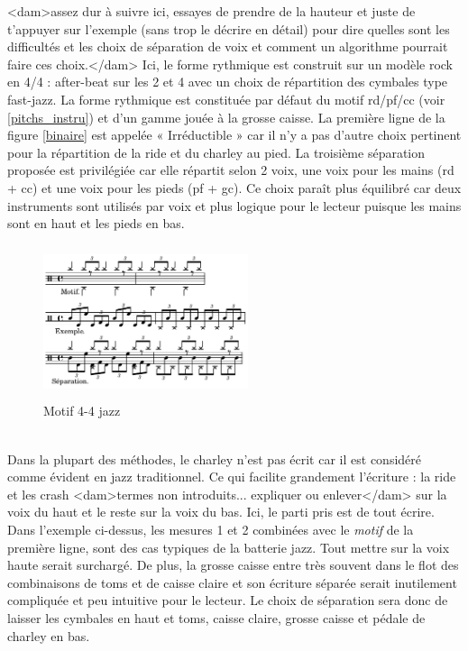 <dam>assez dur à suivre ici, essayes de prendre de la hauteur et juste de t'appuyer sur l'exemple (sans trop le décrire en détail) pour dire quelles sont les difficultés et les choix de séparation de voix et comment un algorithme pourrait faire ces choix.</dam>
Ici, le forme rythmique est construit sur un modèle rock en 4/4 : after-beat
sur les 2 et 4 avec un choix de répartition des cymbales type fast-jazz. La
forme rythmique est constituée par défaut du motif rd/pf/cc (voir
\ref{pitchs_instru}) et d’un gamme jouée à la grosse caisse. La première ligne
de la figure \ref{binaire} est appelée « Irréductible » car il n’y a pas
d’autre choix pertinent pour la répartition de la ride et du charley au pied.
La troisième séparation proposée est privilégiée car elle répartit selon 2
voix, une voix pour les mains (rd + cc) et une voix pour les pieds (pf + gc).
Ce choix paraît plus équilibré car deux instruments sont utilisés par voix et
plus logique pour le lecteur puisque les mains sont en haut et les pieds en
bas.
\begin{figure}[h]
\centering
\includegraphics[height=45mm, width=60mm]{
z_images/3_methodes/2_systemes/2_separation_4-4_jazz.png}
\caption{Motif 4-4 jazz}
\label{jazz}
\end{figure}\\
Dans la plupart des méthodes, le charley n’est pas écrit car il est considéré comme évident en jazz traditionnel. Ce qui facilite grandement l’écriture : la ride et les crash <dam>termes non introduits... expliquer ou enlever</dam> sur la voix du haut et le reste sur la voix du bas. Ici, le parti pris est de tout écrire. 
Dans l’exemple ci-dessus, 
les mesures 1 et 2 combinées avec le \textit{motif} de la première ligne, sont des cas typiques de la batterie jazz. Tout mettre sur la voix haute serait surchargé. De plus, la grosse caisse entre très souvent dans le flot des combinaisons de toms et de caisse claire et son écriture séparée serait inutilement compliquée et peu intuitive pour le lecteur. Le choix de séparation sera donc de laisser les cymbales en haut et toms, caisse claire, grosse caisse et pédale de charley en bas.

